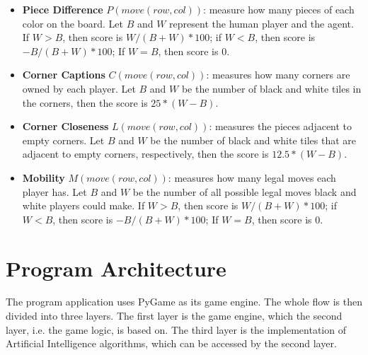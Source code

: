 \documentclass[letterpaper,12pt]{article}
\begin{document}
\begin{itemize}
\item \textbf{Piece Difference} $P(move(row, col))$: measure how many pieces of each color on the board. Let $B$ and $W$ represent the human player and the agent. If $W > B$, then score is $W/(B+W) * 100$; if $W < B$, then score is $-B/(B+W) * 100$; If $W = B$, then score is 0.
\item \textbf{Corner Captions} $C(move(row, col))$: measures how many corners are owned by each player. Let $B$ and $W$ be the number of black and white tiles in the corners, then the score is $25*(W - B)$.
\item \textbf{Corner Closeness} $L(move(row, col))$: measures the pieces adjacent to empty corners. Let $B$ and $W$ be the number of black and white tiles that are adjacent to empty corners, respectively, then the score is $12.5*(W - B)$.
\item \textbf{Mobility} $M(move(row, col))$: measures how many legal moves each player has. Let $B$ and $W$ be the number of all possible legal moves black and white players could make. If $W > B$, then score is $W/(B+W) * 100$; if $W < B$, then score is $-B/(B+W) * 100$; If $W = B$, then score is 0.
\end{itemize}

\section{Program Architecture}

The program application uses PyGame as its game engine. The whole flow is then divided into three layers. The first layer is the game engine, which the second layer, i.e. the game logic, is based on. The third layer is the implementation of Artificial Intelligence algorithms, which can be accessed by the second layer.
\end{document}
